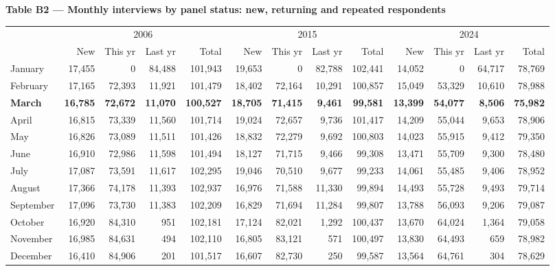 \documentclass[11pt]{article}
\begin{document}
\begin{center}
{\large\bfseries Table B2 --- Monthly interviews by panel status:
new, returning and repeated respondents}\\[1.0em]
\begin{threeparttable}
\setlength{\tabcolsep}{3.6pt}
\begin{tabular}{l rrrr rrrr rrrr}
\toprule
 & \multicolumn{4}{c}{2006} & \multicolumn{4}{c}{2015}
 & \multicolumn{4}{c}{2024} \\
\cmidrule(lr){2-5}\cmidrule(lr){6-9}\cmidrule(lr){10-13}
 & New & This yr & Last yr & Total & New & This yr & Last yr & Total
 & New & This yr & Last yr & Total \\
\midrule
January & 17,455 & 0 & 84,488 & 101,943 & 19,653 & 0 & 82,788 & 102,441 & 14,052 & 0 & 64,717 & 78,769 \\
February & 17,165 & 72,393 & 11,921 & 101,479 & 18,402 & 72,164 & 10,291 & 100,857 & 15,049 & 53,329 & 10,610 & 78,988 \\
\textbf{March} & \textbf{16,785} & \textbf{72,672} & \textbf{11,070} & \textbf{100,527} & \textbf{18,705} & \textbf{71,415} & \textbf{9,461} & \textbf{99,581} & \textbf{13,399} & \textbf{54,077} & \textbf{8,506} & \textbf{75,982} \\
April & 16,815 & 73,339 & 11,560 & 101,714 & 19,024 & 72,657 & 9,736 & 101,417 & 14,209 & 55,044 & 9,653 & 78,906 \\
May & 16,826 & 73,089 & 11,511 & 101,426 & 18,832 & 72,279 & 9,692 & 100,803 & 14,023 & 55,915 & 9,412 & 79,350 \\
June & 16,910 & 72,986 & 11,598 & 101,494 & 18,127 & 71,715 & 9,466 & 99,308 & 13,471 & 55,709 & 9,300 & 78,480 \\
July & 17,087 & 73,591 & 11,617 & 102,295 & 19,046 & 70,510 & 9,677 & 99,233 & 14,061 & 55,485 & 9,406 & 78,952 \\
August & 17,366 & 74,178 & 11,393 & 102,937 & 16,976 & 71,588 & 11,330 & 99,894 & 14,493 & 55,728 & 9,493 & 79,714 \\
September & 17,096 & 73,730 & 11,383 & 102,209 & 16,829 & 71,694 & 11,284 & 99,807 & 13,788 & 56,093 & 9,206 & 79,087 \\
October & 16,920 & 84,310 & 951 & 102,181 & 17,124 & 82,021 & 1,292 & 100,437 & 13,670 & 64,024 & 1,364 & 79,058 \\
November & 16,985 & 84,631 & 494 & 102,110 & 16,805 & 83,121 & 571 & 100,497 & 13,830 & 64,493 & 659 & 78,982 \\
December & 16,410 & 84,906 & 201 & 101,517 & 16,607 & 82,730 & 250 & 99,587 & 13,564 & 64,761 & 304 & 78,629 \\

\end{tabular}
\end{threeparttable}
\end{center}
\end{document}
